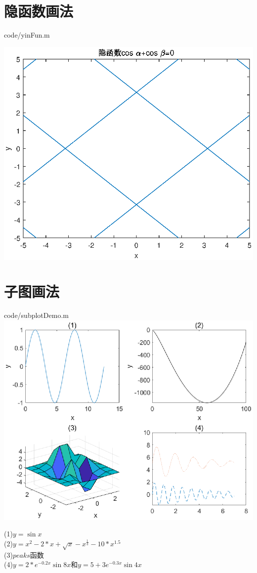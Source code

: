 \documentclass{hfutpaper}
\makeatletter
\newcommand{\figcaption}{\def\@captype{figure}\caption}
\makeatother
\begin{document}
\section*{隐函数画法}

{code/yinFun.m}

\includegraphics{figure/yinFunc}
\figcaption{隐函数$\cos \alpha+\cos \beta=0$}
\section*{子图画法}

{code/subplotDemo.m}
\includegraphics{figure/subplot}
\figcaption{子图画法}
\begin{center}
	(1)$y=\sin x$\\(2)$y=x^2-2*x+\sqrt{x}-x^{\frac{1}{3}}-10*x^{1.5}$\\
	(3)$peaks$函数\\(4)$y=2*e^{-0.2x}\sin 8x$和$y=5+3e^{-0.3x}\sin 4x$
\end{center}
\end{document}
